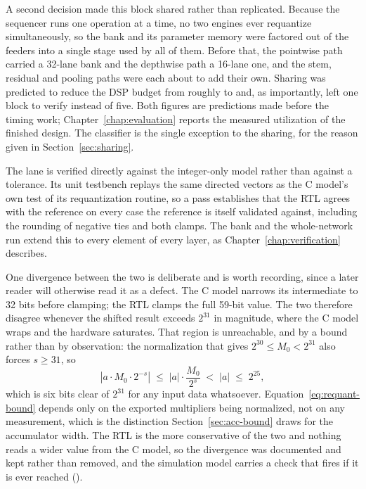 A second decision made this block shared rather than replicated. Because the
sequencer runs one operation at a time, no two engines ever requantize
simultaneously, so the bank and its parameter memory were factored out of the
feeders into a single stage used by all of them. Before that, the pointwise
path carried a 32-lane bank and the depthwise path a 16-lane one, and the stem,
residual and pooling paths were each about to add their own. Sharing was
predicted to reduce the DSP budget from roughly \thDspPredUnshared{} to
\thDspPredShared{} and, as importantly, left one block to verify instead of
five. Both figures are predictions made before the timing work;
Chapter~\ref{chap:evaluation} reports the measured utilization of the finished
design. The classifier is the single exception to the sharing, for the reason
given in Section~\ref{sec:sharing}.

The lane is verified directly against the integer-only model rather than
against a tolerance. Its unit testbench replays the same directed vectors as
the C model's own test of its requantization routine, so a pass establishes
that the RTL agrees with the reference on every case the reference is itself
validated against, including the rounding of negative ties and both clamps.
The bank and the whole-network run extend this to every element of every
layer, as Chapter~\ref{chap:verification} describes.

One divergence between the two is deliberate and is worth recording, since a
later reader will otherwise read it as a defect. The C model narrows its
intermediate to 32 bits before clamping; the RTL clamps the full 59-bit value.
The two therefore disagree whenever the shifted result exceeds $2^{31}$ in
magnitude, where the C model wraps and the hardware saturates. That region is
unreachable, and by a bound rather than by observation: the normalization that
gives $2^{30} \le M_0 < 2^{31}$ also forces $s \ge 31$, so
\begin{equation}
  \left| a \cdot M_0 \cdot 2^{-s} \right| \;\le\; |a| \cdot \frac{M_0}{2^{s}}
  \;<\; |a| \;\le\; 2^{25},
  \label{eq:requant-bound}
\end{equation}
which is six bits clear of $2^{31}$ for any input data whatsoever.
Equation~\eqref{eq:requant-bound} depends only on the exported multipliers
being normalized, not on any measurement, which is the distinction
Section~\ref{sec:acc-bound} draws for the accumulator width. The RTL is the
more conservative of the two and nothing reads a wider value from the C model,
so the divergence was documented and kept rather than removed, and the
simulation model carries a check that fires if it is ever reached ().

